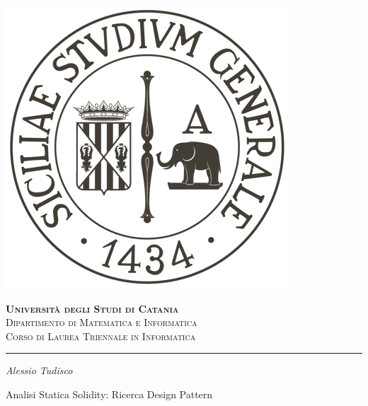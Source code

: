 \begin{titlepage}
	
\centering

\includegraphics[scale=0.25]{components/images/university-logo}

\bigskip

\gdef\@phd@university{
	{\LARGE \bfseries Universit\`{a} degli Studi di Catania}\\ 
	{\large Dipartimento di Matematica e Informatica}\\ 
	{Corso di Laurea Triennale in Informatica}\\
	\bigskip}

\textsc{\@phd@university}\par

\hrule

\bigskip

\bigskip

\bigskip

\bigskip

\bigskip

\bigskip

{\itshape \large
	Alessio Tudisco\par
}

\bigskip

\bigskip

\bigskip

\bigskip

\bigskip

\bigskip

{\Large Analisi Statica Solidity: Ricerca Design Pattern}\par


\end{titlepage}
